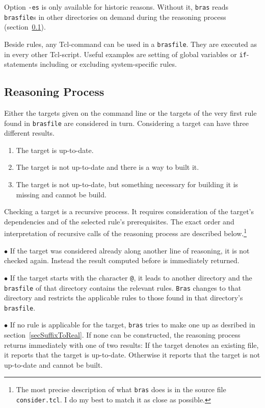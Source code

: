 \documentclass[12pt]{article}
\newcommand{\bras}{\texttt{bras}}
\newcommand{\Bras}{\texttt{Bras}}
\begin{document}
Option \texttt{-es} is only available for historic reasons. Without
it, \bras{} reads \texttt{brasfile}s in other directories on demand
during the reasoning process (section~\ref{secReasoning}).

Beside rules, any Tcl-command can be used in a \texttt{brasfile}. They
are executed as in every other Tcl-script. Useful examples are setting
of global variables or \texttt{if}-statements including or excluding
system-specific rules.

\subsection{Reasoning Process}
\label{secReasoning}
Either the targets given on the command line or the targets of the
very first rule found in \texttt{brasfile} are considered in
turn. Considering a target can have three different results. 
\begin{enumerate}
\item
The target is up-to-date.
\item
The target is not up-to-date and there is a way to built it.
\item
The target is not up-to-date, but something necessary for building it
is missing and cannot be build.
\end{enumerate}
Checking a target is a recursive process. It requires consideration of
the target's dependencies and of the selected rule's
prerequisites. The exact order and interpretation of recursive calls
of the reasoning process are described below.\footnote{The most
precise description of what \bras{} does is in the
source file \texttt{consider.tcl}. I do my best to match it as close
as possible.}

$\bullet$ If the target was considered already along another line of
reasoning, it is not checked again. Instead the result computed before
is immediately returned.

$\bullet$ If the target starts with the character \texttt{@}, it leads
to another directory and the \texttt{brasfile} of that directory
contains the relevant rules. \Bras{} changes to that
directory and restricts the applicable rules to those found in that
directory's \texttt{brasfile}.

$\bullet$ If no rule is applicable for the target, \bras{} tries to
make one up as desribed in section~\ref{secSuffixToReal}. If none can be
constructed, the reasoning process returns immediately with one of two
results: If the target denotes an existing file, it reports that the
target is up-to-date. Otherwise it reports that the target is not
up-to-date and cannot be built.
\end{document}
